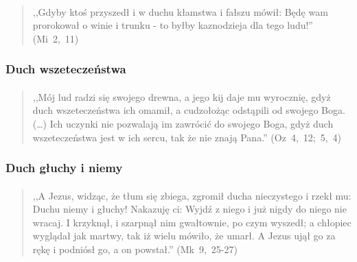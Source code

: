 \documentclass[10pt,a4paper,oneside]{article}
\begin{document}
\paragraph{}
\begin{quote}
,,Gdyby ktoś przyszedł i w duchu kłamstwa i fałszu mówił: Będę wam prorokował o winie i trunku - to byłby kaznodzieja dla tego ludu!'' \mbox{(Mi 2, 11)}
\end{quote}
\subsubsection{Duch wszeteczeństwa}
\paragraph{}
\begin{quote}
,,Mój lud radzi się swojego drewna, a jego kij daje mu wyrocznię, gdyż duch wszeteczeństwa ich omamił, a cudzołożąc odstąpili od swojego Boga. (\ldots) Ich uczynki nie pozwalają im zawrócić do swojego Boga, gdyż duch wszeteczeństwa jest w ich sercu, tak że nie znają Pana.'' \mbox{(Oz 4, 12; 5, 4)}
\end{quote}
\subsubsection{Duch głuchy i niemy}
\paragraph{}
\begin{quote}
,,A Jezus, widząc, że tłum się zbiega, zgromił ducha nieczystego i rzekł mu: Duchu niemy i głuchy! Nakazuję ci: Wyjdź z niego i już nigdy do niego nie wracaj. I krzyknął, i szarpnął nim gwałtownie, po czym wyszedł; a chłopiec wyglądał jak martwy, tak iż wielu mówiło, że umarł. A Jezus ujął go za rękę i podniósł go, a on powstał.'' \mbox{(Mk 9, 25-27)}
\end{quote}
\end{document}
